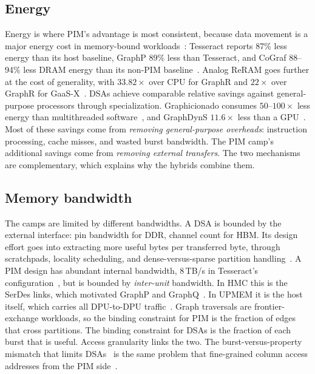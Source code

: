 \documentclass[journal,onecolumn]{IEEEtran}
\begin{document}
\subsection{Energy}
Energy is where PIM's advantage is most consistent, because data movement is a major energy cost in memory-bound workloads~\cite{gomezluna2022prim}: Tesseract reports 87\% less energy than its host baseline, GraphP 89\% less than Tesseract, and CoGraf 88--94\% less DRAM energy than its non-PIM baseline~\cite{ahn2015tesseract,zhang2018graphp,yenimol2026cograf}. Analog ReRAM goes further at the cost of generality, with $33.82\times$ over CPU for GraphR and $22\times$ over GraphR for GaaS-X~\cite{song2018graphr,challapalle2020gaasx}. DSAs achieve comparable relative savings against general-purpose processors through specialization. Graphicionado consumes $50$--$100\times$ less energy than multithreaded software~\cite{ham2016graphicionado}, and GraphDynS $11.6\times$ less than a GPU~\cite{yan2019graphdyns}. Most of these savings come from \emph{removing general-purpose overheads}: instruction processing, cache misses, and wasted burst bandwidth. The PIM camp's additional savings come from \emph{removing external transfers}. The two mechanisms are complementary, which explains why the hybrids combine them.

\subsection{Memory bandwidth}
The camps are limited by different bandwidths. A DSA is bounded by the external interface: pin bandwidth for DDR, channel count for HBM. Its design effort goes into extracting more useful bytes per transferred byte, through scratchpads, locality scheduling, and dense-versus-sparse partition handling~\cite{ham2016graphicionado,mukkara2018hats,chen2022regraph}. A PIM design has abundant internal bandwidth, 8\,TB/s in Tesseract's configuration~\cite{ahn2015tesseract}, but is bounded by \emph{inter-unit} bandwidth. In HMC this is the SerDes links, which motivated GraphP and GraphQ~\cite{zhang2018graphp,zhuo2019graphq}. In UPMEM it is the host itself, which carries all DPU-to-DPU traffic~\cite{gomezluna2022prim}. Graph traversals are frontier-exchange workloads, so the binding constraint for PIM is the fraction of edges that cross partitions. The binding constraint for DSAs is the fraction of each burst that is useful. Access granularity links the two. The burst-versus-property mismatch that limits DSAs~\cite{shin2025piccolo} is the same problem that fine-grained column access addresses from the PIM side~\cite{shin2025fala,yenimol2026cograf}.
\end{document}
